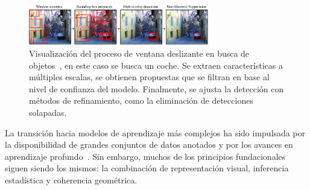 \begin{figure}[htp]
\begin{center}
    \includegraphics[width=0.7\textwidth]{imagenes/chapter2/selective_search}
\end{center}
\caption{
Visualización del proceso de ventana deslizante en busca de objetos~\cite{VisionBookMIT}, en este caso se busca un coche.
Se extraen características a múltiples escalas, se obtienen propuestas que se filtran en base al nivel de confianza del modelo. Finalmente, 
se ajusta la detección con métodos de refinamiento, como la eliminación de detecciones solapadas.
}
\label{fig:SelectiveSearch}
\end{figure}

\par 
La transición hacia modelos de aprendizaje más complejos ha sido impulsada por la disponibilidad de grandes conjuntos de datos anotados y 
por los avances en aprendizaje profundo~\cite{ObjectDetectionSurvey}. Sin embargo, muchos de los principios fundacionales siguen siendo 
los mismos: la combinación de representación visual, inferencia estadística y coherencia geométrica.
